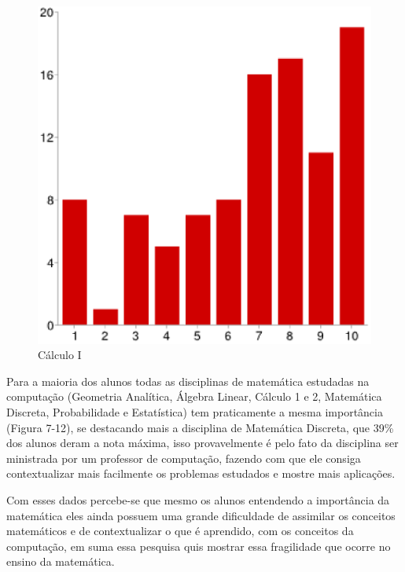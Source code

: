 \documentclass[12pt,a4paper]{article}
\begin{document}
\begin{figure}[htb]
	\center
	\includegraphics[scale=0.36]{imagens/9.eps} 
	\caption{Cálculo I}
	\label{fig:grafCalc}
\end{figure}

Para a maioria dos alunos todas as disciplinas de matemática estudadas na computação (Geometria Analítica, Álgebra Linear, Cálculo 1 e 2, Matemática Discreta, Probabilidade e Estatística) tem praticamente a mesma importância (Figura 7-12), se destacando mais a disciplina de Matemática Discreta, que 39\% dos alunos deram a nota máxima, isso provavelmente é pelo fato da disciplina ser ministrada por um professor de computação, fazendo com que ele consiga contextualizar mais facilmente os problemas estudados e mostre mais aplicações. 

Com esses dados percebe-se que mesmo os alunos entendendo a importância da matemática eles ainda possuem uma grande dificuldade de assimilar os conceitos matemáticos e de contextualizar o que é aprendido, com os conceitos da computação, em suma essa pesquisa quis mostrar essa fragilidade que ocorre no ensino da matemática. 
\end{document}
